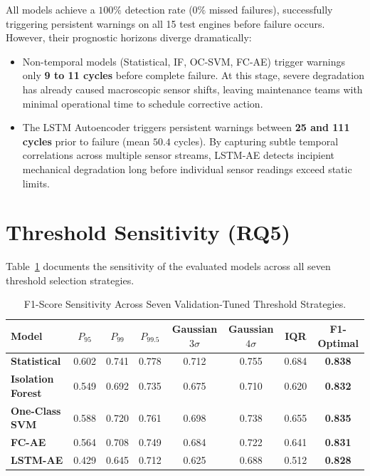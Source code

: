 \documentclass[12pt,a4paper,oneside]{report}
\begin{document}
All models achieve a $100\%$ detection rate ($0\%$ missed failures), successfully triggering persistent warnings on all 15 test engines before failure occurs. However, their prognostic horizons diverge dramatically:
\begin{itemize}
    \item Non-temporal models (Statistical, IF, OC-SVM, FC-AE) trigger warnings only \textbf{9 to 11 cycles} before complete failure. At this stage, severe degradation has already caused macroscopic sensor shifts, leaving maintenance teams with minimal operational time to schedule corrective action.
    \item The LSTM Autoencoder triggers persistent warnings between \textbf{25 and 111 cycles} prior to failure (mean $50.4$ cycles). By capturing subtle temporal correlations across multiple sensor streams, LSTM-AE detects incipient mechanical degradation long before individual sensor readings exceed static limits.
\end{itemize}

\section{Threshold Sensitivity (RQ5)}
Table~\ref{tab:threshold_sensitivity} documents the sensitivity of the evaluated models across all seven threshold selection strategies.

\begin{table}[htbp]
    \centering
    \small
    \caption{F1-Score Sensitivity Across Seven Validation-Tuned Threshold Strategies.}
    \label{tab:threshold_sensitivity}
    \begin{tabular}{lccccccc}
        \toprule
        \textbf{Model} & \textbf{$P_{95}$} & \textbf{$P_{99}$} & \textbf{$P_{99.5}$} & \textbf{Gaussian $3\sigma$} & \textbf{Gaussian $4\sigma$} & \textbf{IQR} & \textbf{F1-Optimal} \\
        \midrule
        \textbf{Statistical} & 0.602 & 0.741 & 0.778 & 0.712 & 0.755 & 0.684 & \textbf{0.838} \\
        \textbf{Isolation Forest} & 0.549 & 0.692 & 0.735 & 0.675 & 0.710 & 0.620 & \textbf{0.832} \\
        \textbf{One-Class SVM} & 0.588 & 0.720 & 0.761 & 0.698 & 0.738 & 0.655 & \textbf{0.835} \\
        \textbf{FC-AE} & 0.564 & 0.708 & 0.749 & 0.684 & 0.722 & 0.641 & \textbf{0.831} \\
        \textbf{LSTM-AE} & 0.429 & 0.645 & 0.712 & 0.625 & 0.688 & 0.512 & \textbf{0.828} \\
        \bottomrule
    \end{tabular}
\end{table}
\end{document}
